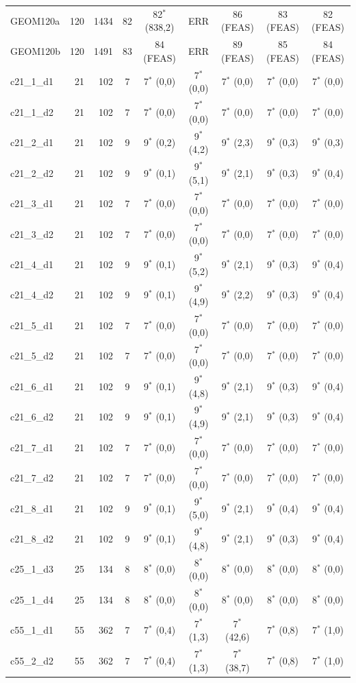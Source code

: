 \begin{longtable}{lrrcccccc}
GEOM120a & 120 & 1434 & 82 & 82$^{*}$ (838,2) & ERR & 86 (FEAS) & 83 (FEAS) & 82 (FEAS) \\
GEOM120b & 120 & 1491 & 83 & 84 (FEAS) & ERR & 89 (FEAS) & 85 (FEAS) & 84 (FEAS) \\
c21\_1\_d1 & 21 & 102 & 7 & 7$^{*}$ (0,0) & 7$^{*}$ (0,0) & 7$^{*}$ (0,0) & 7$^{*}$ (0,0) & 7$^{*}$ (0,0) \\
c21\_1\_d2 & 21 & 102 & 7 & 7$^{*}$ (0,0) & 7$^{*}$ (0,0) & 7$^{*}$ (0,0) & 7$^{*}$ (0,0) & 7$^{*}$ (0,0) \\
c21\_2\_d1 & 21 & 102 & 9 & 9$^{*}$ (0,2) & 9$^{*}$ (4,2) & 9$^{*}$ (2,3) & 9$^{*}$ (0,3) & 9$^{*}$ (0,3) \\
c21\_2\_d2 & 21 & 102 & 9 & 9$^{*}$ (0,1) & 9$^{*}$ (5,1) & 9$^{*}$ (2,1) & 9$^{*}$ (0,3) & 9$^{*}$ (0,4) \\
c21\_3\_d1 & 21 & 102 & 7 & 7$^{*}$ (0,0) & 7$^{*}$ (0,0) & 7$^{*}$ (0,0) & 7$^{*}$ (0,0) & 7$^{*}$ (0,0) \\
c21\_3\_d2 & 21 & 102 & 7 & 7$^{*}$ (0,0) & 7$^{*}$ (0,0) & 7$^{*}$ (0,0) & 7$^{*}$ (0,0) & 7$^{*}$ (0,0) \\
c21\_4\_d1 & 21 & 102 & 9 & 9$^{*}$ (0,1) & 9$^{*}$ (5,2) & 9$^{*}$ (2,1) & 9$^{*}$ (0,3) & 9$^{*}$ (0,4) \\
c21\_4\_d2 & 21 & 102 & 9 & 9$^{*}$ (0,1) & 9$^{*}$ (4,9) & 9$^{*}$ (2,2) & 9$^{*}$ (0,3) & 9$^{*}$ (0,4) \\
c21\_5\_d1 & 21 & 102 & 7 & 7$^{*}$ (0,0) & 7$^{*}$ (0,0) & 7$^{*}$ (0,0) & 7$^{*}$ (0,0) & 7$^{*}$ (0,0) \\
c21\_5\_d2 & 21 & 102 & 7 & 7$^{*}$ (0,0) & 7$^{*}$ (0,0) & 7$^{*}$ (0,0) & 7$^{*}$ (0,0) & 7$^{*}$ (0,0) \\
c21\_6\_d1 & 21 & 102 & 9 & 9$^{*}$ (0,1) & 9$^{*}$ (4,8) & 9$^{*}$ (2,1) & 9$^{*}$ (0,3) & 9$^{*}$ (0,4) \\
c21\_6\_d2 & 21 & 102 & 9 & 9$^{*}$ (0,1) & 9$^{*}$ (4,9) & 9$^{*}$ (2,1) & 9$^{*}$ (0,3) & 9$^{*}$ (0,4) \\
c21\_7\_d1 & 21 & 102 & 7 & 7$^{*}$ (0,0) & 7$^{*}$ (0,0) & 7$^{*}$ (0,0) & 7$^{*}$ (0,0) & 7$^{*}$ (0,0) \\
c21\_7\_d2 & 21 & 102 & 7 & 7$^{*}$ (0,0) & 7$^{*}$ (0,0) & 7$^{*}$ (0,0) & 7$^{*}$ (0,0) & 7$^{*}$ (0,0) \\
c21\_8\_d1 & 21 & 102 & 9 & 9$^{*}$ (0,1) & 9$^{*}$ (5,0) & 9$^{*}$ (2,1) & 9$^{*}$ (0,4) & 9$^{*}$ (0,4) \\
c21\_8\_d2 & 21 & 102 & 9 & 9$^{*}$ (0,1) & 9$^{*}$ (4,8) & 9$^{*}$ (2,1) & 9$^{*}$ (0,3) & 9$^{*}$ (0,4) \\
c25\_1\_d3 & 25 & 134 & 8 & 8$^{*}$ (0,0) & 8$^{*}$ (0,0) & 8$^{*}$ (0,0) & 8$^{*}$ (0,0) & 8$^{*}$ (0,0) \\
c25\_1\_d4 & 25 & 134 & 8 & 8$^{*}$ (0,0) & 8$^{*}$ (0,0) & 8$^{*}$ (0,0) & 8$^{*}$ (0,0) & 8$^{*}$ (0,0) \\
c55\_1\_d1 & 55 & 362 & 7 & 7$^{*}$ (0,4) & 7$^{*}$ (1,3) & 7$^{*}$ (42,6) & 7$^{*}$ (0,8) & 7$^{*}$ (1,0) \\
c55\_2\_d2 & 55 & 362 & 7 & 7$^{*}$ (0,4) & 7$^{*}$ (1,3) & 7$^{*}$ (38,7) & 7$^{*}$ (0,8) & 7$^{*}$ (1,0) \\
\end{longtable}
